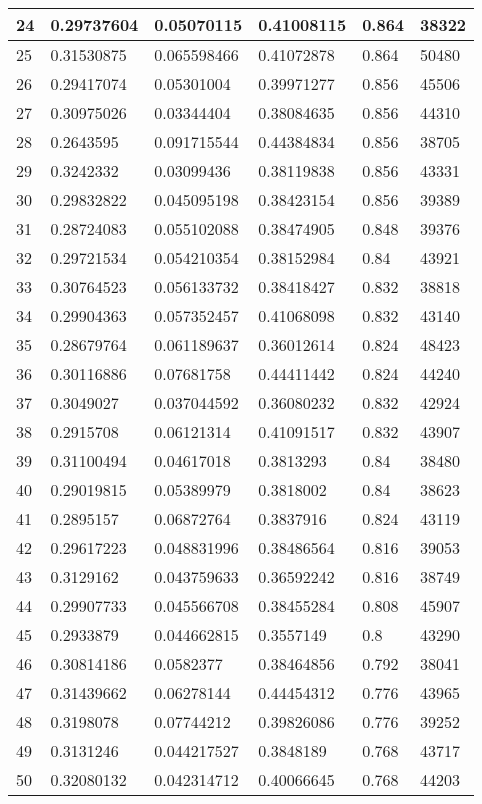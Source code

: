 \begin{longtable}{|l|l|l|l|l|l|}
24 & 0.29737604 & 0.05070115 & 0.41008115 & 0.864 & 38322 \\ \hline 
25 & 0.31530875 & 0.065598466 & 0.41072878 & 0.864 & 50480 \\ \hline 
26 & 0.29417074 & 0.05301004 & 0.39971277 & 0.856 & 45506 \\ \hline 
27 & 0.30975026 & 0.03344404 & 0.38084635 & 0.856 & 44310 \\ \hline 
28 & 0.2643595 & 0.091715544 & 0.44384834 & 0.856 & 38705 \\ \hline 
29 & 0.3242332 & 0.03099436 & 0.38119838 & 0.856 & 43331 \\ \hline 
30 & 0.29832822 & 0.045095198 & 0.38423154 & 0.856 & 39389 \\ \hline 
31 & 0.28724083 & 0.055102088 & 0.38474905 & 0.848 & 39376 \\ \hline 
32 & 0.29721534 & 0.054210354 & 0.38152984 & 0.84 & 43921 \\ \hline 
33 & 0.30764523 & 0.056133732 & 0.38418427 & 0.832 & 38818 \\ \hline 
34 & 0.29904363 & 0.057352457 & 0.41068098 & 0.832 & 43140 \\ \hline 
35 & 0.28679764 & 0.061189637 & 0.36012614 & 0.824 & 48423 \\ \hline 
36 & 0.30116886 & 0.07681758 & 0.44411442 & 0.824 & 44240 \\ \hline 
37 & 0.3049027 & 0.037044592 & 0.36080232 & 0.832 & 42924 \\ \hline 
38 & 0.2915708 & 0.06121314 & 0.41091517 & 0.832 & 43907 \\ \hline 
39 & 0.31100494 & 0.04617018 & 0.3813293 & 0.84 & 38480 \\ \hline 
40 & 0.29019815 & 0.05389979 & 0.3818002 & 0.84 & 38623 \\ \hline 
41 & 0.2895157 & 0.06872764 & 0.3837916 & 0.824 & 43119 \\ \hline 
42 & 0.29617223 & 0.048831996 & 0.38486564 & 0.816 & 39053 \\ \hline 
43 & 0.3129162 & 0.043759633 & 0.36592242 & 0.816 & 38749 \\ \hline 
44 & 0.29907733 & 0.045566708 & 0.38455284 & 0.808 & 45907 \\ \hline 
45 & 0.2933879 & 0.044662815 & 0.3557149 & 0.8 & 43290 \\ \hline 
46 & 0.30814186 & 0.0582377 & 0.38464856 & 0.792 & 38041 \\ \hline 
47 & 0.31439662 & 0.06278144 & 0.44454312 & 0.776 & 43965 \\ \hline 
48 & 0.3198078 & 0.07744212 & 0.39826086 & 0.776 & 39252 \\ \hline 
49 & 0.3131246 & 0.044217527 & 0.3848189 & 0.768 & 43717 \\ \hline 
50 & 0.32080132 & 0.042314712 & 0.40066645 & 0.768 & 44203 \\ \hline 
\end{longtable}